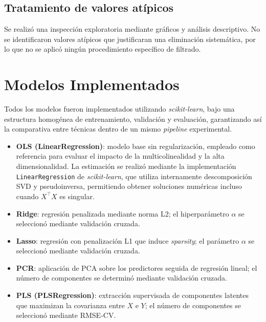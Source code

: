\documentclass[12pt,a4paper]{report}
\begin{document}
\subsection{Tratamiento de valores atípicos}

Se realizó una inspección exploratoria mediante gráficos y análisis descriptivo. No se identificaron valores atípicos que justificaran una eliminación sistemática, por lo que no se aplicó ningún procedimiento específico de filtrado.

\section{Modelos Implementados}

Todos los modelos fueron implementados utilizando \textit{scikit-learn}, bajo una 
estructura homogénea de entrenamiento, validación y evaluación, garantizando así la comparativa entre técnicas dentro de un mismo \textit{pipeline} experimental.

\begin{itemize}
    \item \textbf{OLS (LinearRegression)}: modelo base sin regularización, empleado como referencia para evaluar el impacto de la multicolinealidad y la alta dimensionalidad. La estimación se realizó mediante la implementación \texttt{LinearRegression} de \textit{scikit-learn}, que utiliza internamente descomposición SVD y pseudoinversa, permitiendo obtener soluciones numéricas incluso cuando \(X^\top X\) es singular.

    \item \textbf{Ridge}: regresión penalizada mediante norma L2; el hiperparámetro $\alpha$ se seleccionó mediante validación cruzada.

    \item \textbf{Lasso}: regresión con penalización L1 que induce \textit{sparsity}; el parámetro $\alpha$ se seleccionó mediante validación cruzada.

    \item \textbf{PCR}: aplicación de PCA sobre los predictores seguida de regresión lineal; el número de componentes se determinó mediante validación cruzada.

    \item \textbf{PLS (PLSRegression)}: extracción supervisada de componentes latentes que maximizan la covarianza entre $X$ e $Y$; el número de componentes se seleccionó mediante RMSE-CV.
\end{itemize}
\end{document}
